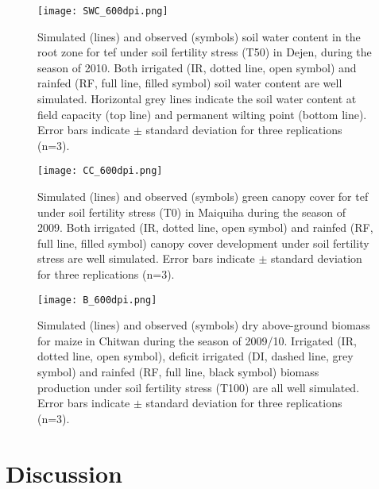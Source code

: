 \begin{figure}[tbhp]
	\centering
		\texttt{[image: SWC\_600dpi.png]}
	\caption{Simulated (lines) and observed (symbols) soil water content in the root zone for tef under soil fertility stress (T50) in Dejen, during the season of 2010. Both irrigated (IR, dotted line, open symbol) and rainfed (RF, full line, filled symbol) soil water content are well simulated. Horizontal grey lines indicate the soil water content at field capacity (top line) and permanent wilting point (bottom line). Error bars indicate $\pm$ standard deviation for three replications (n=3).}
	\label{fig:ch3_SWC}
\end{figure}

\begin{figure}[tbhp]
	\centering
		\texttt{[image: CC\_600dpi.png]}
	\caption{Simulated (lines) and observed (symbols) green canopy cover for tef under soil fertility stress (T0) in Maiquiha during the season of 2009. Both irrigated (IR, dotted line, open symbol) and rainfed (RF, full line, filled symbol) canopy cover development under soil fertility stress are well simulated. Error bars indicate $\pm$ standard deviation for three replications (n=3).}
	\label{fig:ch3_CC}
\end{figure}

\begin{figure}[tbhp]
	\centering
		\texttt{[image: B\_600dpi.png]}
	\caption{Simulated (lines) and observed (symbols) dry above-ground biomass for maize in Chitwan during the season of 2009/10. Irrigated (IR, dotted line, open symbol), deficit irrigated (DI, dashed line, grey symbol) and rainfed (RF, full line, black symbol) biomass production under soil fertility stress (T100) are all well simulated. Error bars indicate $\pm$ standard deviation for three replications (n=3).}
	\label{fig:ch3_B}
\end{figure}

\section{Discussion}
